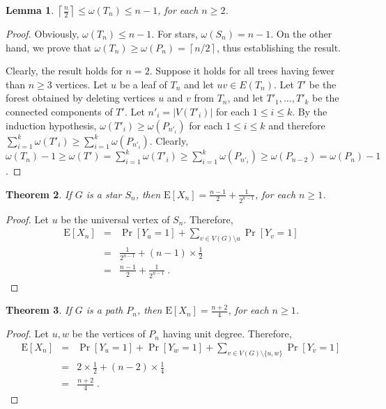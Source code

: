\documentclass{article}
\newcommand{\set}[1][ ]{\{ #1 \}}
\newtheorem{lem}{Lemma}
\newtheorem{thm}[lem]{Theorem}
\begin{document}
\begin{lem}
\label{WTnWPn}
$\left\lceil \frac{n}{2} \right\rceil \leq \omega(T_n) \leq n - 1$, for each
$n \geq 2$.
\end{lem}

\begin{proof}
Obviously, $\omega(T_n) \leq n - 1$. For stars, $\omega(S_n) = n - 1$. On the
other hand, we prove that
$\omega(T_n) \geq \omega(P_n) = \left\lceil n/2 \right\rceil$, thus establishing
the result.

Clearly, the result holds for $n = 2$. Suppose it holds for all trees having
fewer than $n \geq 3$ vertices. Let $u$ be a leaf of $T_n$ and let
$uv \in E(T_n)$. Let $T'$ be the forest obtained by deleting vertices $u$ and
$v$ from $T_n$, and let $T'_1,\ldots,T'_k$ be the connected components of $T'$.
Let $n'_i = |V(T'_i)|$ for each $1 \leq i \leq k$. By the induction hypothesis,
$\omega(T'_i) \geq \omega(P_{n'_i})$ for each $1 \leq i \leq k$ and therefore
$\sum_{i=1}^k \omega(T'_i) \geq \sum_{i=1}^k \omega(P_{n'_i})$. Clearly,
$\omega(T_n) - 1 \geq \omega(T') = \sum_{i=1}^k \omega(T'_i) \geq \sum_{i=1}^k \omega(P_{n'_i}) \geq \omega(P_{n-2}) = \omega(P_n) - 1$.
\end{proof}

\begin{thm}
\label{EXSn}
If $G$ is a star $S_n$, then
$\mathrm{E}[X_n] = \frac{n-1}{2} + \frac{1}{2^{n-1}}$, for each $n \geq 1$.
\end{thm}

\begin{proof}
Let $u$ be the universal vertex of $S_n$. Therefore,
\begin{eqnarray*}
	 \mathrm{E}[X_n] & = & \Pr[Y_u = 1] + \sum_{v \in V(G)\setminus u} \Pr[Y_v = 1] \\
	      & = & \frac{1}{2^{n-1}} + (n-1) \times \frac{1}{2} \\
		  & = & \frac{n-1}{2} + \frac{1}{2^{n-1}} \;{.}
\end{eqnarray*}
\end{proof}

\begin{thm}
\label{EXPn}
If $G$ is a path $P_n$, then $\mathrm{E}[X_n] = \frac{n+2}{4}$, for each
$n \geq 1$.
\end{thm}

\begin{proof}
Let $u,w$ be the vertices of $P_n$ having unit degree. Therefore,
\begin{eqnarray*}
	 \mathrm{E}[X_n] & = & \Pr[Y_u = 1] + \Pr[Y_w = 1] + \sum_{v \in V(G)\setminus \set [u,w]} \Pr[Y_v = 1] \\
	    & = & 2 \times \frac{1}{2} + (n-2) \times \frac{1}{4}  \\
		& = & \frac{n+2}{4} \;{.}
\end{eqnarray*}
\end{proof}
\end{document}
